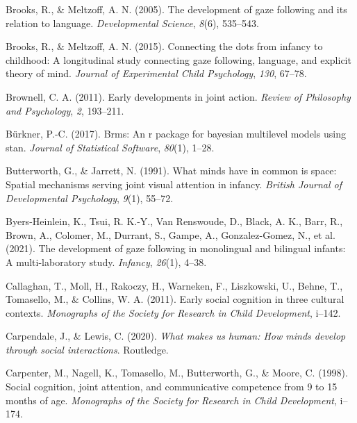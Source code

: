 \documentclass[
  man,floatsintext]{apa7}
\newlength{\cslhangindent}
\newlength{\cslentryspacingunit} %
\newenvironment{CSLReferences}[2] %
 {%
  \setlength{\parindent}{0pt}
  \ifodd #1
  \let\oldpar\par
  \def\par{\hangindent=\cslhangindent\oldpar}
  \fi
  \setlength{\parskip}{#2\cslentryspacingunit}
 }%
 {}
\begin{document}
\begin{CSLReferences}{1}{0}
\leavevmode{}%
Brooks, R., \& Meltzoff, A. N. (2005). The development of gaze following and its relation to language. \emph{Developmental Science}, \emph{8}(6), 535--543.

\leavevmode{}%
Brooks, R., \& Meltzoff, A. N. (2015). Connecting the dots from infancy to childhood: A longitudinal study connecting gaze following, language, and explicit theory of mind. \emph{Journal of Experimental Child Psychology}, \emph{130}, 67--78.

\leavevmode{}%
Brownell, C. A. (2011). Early developments in joint action. \emph{Review of Philosophy and Psychology}, \emph{2}, 193--211.

\leavevmode{}%
Bürkner, P.-C. (2017). Brms: An r package for bayesian multilevel models using stan. \emph{Journal of Statistical Software}, \emph{80}(1), 1--28.

\leavevmode{}%
Butterworth, G., \& Jarrett, N. (1991). What minds have in common is space: Spatial mechanisms serving joint visual attention in infancy. \emph{British Journal of Developmental Psychology}, \emph{9}(1), 55--72.

\leavevmode{}%
Byers-Heinlein, K., Tsui, R. K.-Y., Van Renswoude, D., Black, A. K., Barr, R., Brown, A., Colomer, M., Durrant, S., Gampe, A., Gonzalez-Gomez, N., et al. (2021). The development of gaze following in monolingual and bilingual infants: A multi-laboratory study. \emph{Infancy}, \emph{26}(1), 4--38.

\leavevmode{}%
Callaghan, T., Moll, H., Rakoczy, H., Warneken, F., Liszkowski, U., Behne, T., Tomasello, M., \& Collins, W. A. (2011). Early social cognition in three cultural contexts. \emph{Monographs of the Society for Research in Child Development}, i--142.

\leavevmode{}%
Carpendale, J., \& Lewis, C. (2020). \emph{What makes us human: How minds develop through social interactions}. Routledge.

\leavevmode{}%
Carpenter, M., Nagell, K., Tomasello, M., Butterworth, G., \& Moore, C. (1998). Social cognition, joint attention, and communicative competence from 9 to 15 months of age. \emph{Monographs of the Society for Research in Child Development}, i--174.


\end{CSLReferences}
\end{document}
